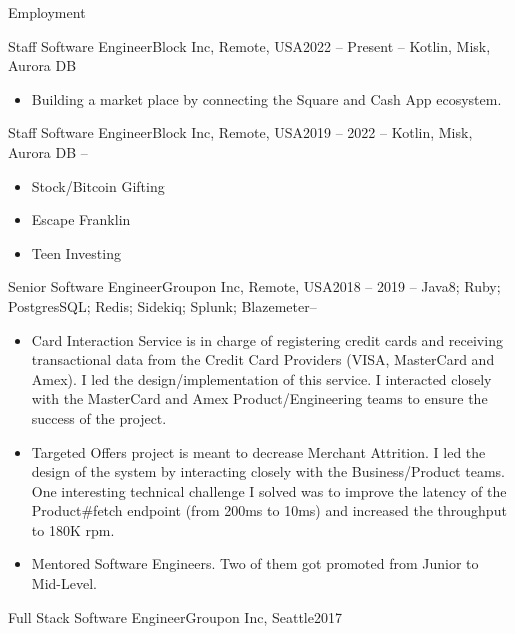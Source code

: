 \documentclass[includefoot]{mcdowellcv}
\begin{document}
	\makeheader
	\begin{cvsection}{Employment}
		\begin{cvsubsection}{Staff Software Engineer}{Block Inc, Remote, USA}{2022 -- Present}
			 -- Kotlin, Misk, Aurora DB
			\begin{itemize}
				\item Building a market place by connecting the Square and Cash App ecosystem.
			\end{itemize}
		\end{cvsubsection}
		\begin{cvsubsection}{Staff Software Engineer}{Block Inc, Remote, USA}{2019 -- 2022}
			 -- Kotlin, Misk, Aurora DB -- 
			\begin{itemize}
				\item Stock/Bitcoin Gifting
				\item Escape Franklin
				\item Teen Investing
			\end{itemize}
		\end{cvsubsection}
		\begin{cvsubsection}{Senior Software Engineer}{Groupon Inc, Remote, USA}{2018 -- 2019}
			 -- Java8; Ruby; PostgresSQL; Redis; Sidekiq; Splunk; Blazemeter--
			\begin{itemize}
				\item Card Interaction Service is in charge of registering credit cards and receiving transactional data from the Credit Card Providers (VISA, MasterCard and Amex). I led the design/implementation of this service. I interacted closely with the MasterCard and Amex Product/Engineering teams to ensure the success of the project. 
			 	\item Targeted Offers project is meant to decrease Merchant Attrition. I led the design of the system by interacting closely with the Business/Product teams. One interesting technical challenge I solved was to improve the latency of the Product\#fetch endpoint (from 200ms to 10ms) and increased the throughput to 180K rpm.
				\item Mentored Software Engineers. Two of them got promoted from Junior to Mid-Level.
			\end{itemize}
		\end{cvsubsection}
		\begin{cvsubsection}{Full Stack Software Engineer}{Groupon Inc, Seattle}{2017}

\end{cvsubsection}
\end{cvsection}
\end{document}
